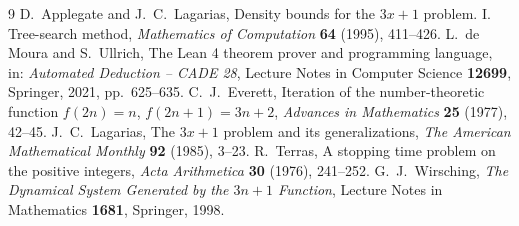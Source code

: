 \documentclass[11pt,reqno,oneside]{amsart}
\theoremstyle{plain}
\theoremstyle{definition}
\numberwithin{equation}{section}
\begin{document}
\begin{thebibliography}{9}
D.~Applegate and J.~C.~Lagarias, Density bounds for the $3x+1$ problem. I. Tree-search method, \emph{Mathematics of Computation} \textbf{64} (1995), 411--426.
L.~de Moura and S.~Ullrich, The Lean 4 theorem prover and programming language, in: \emph{Automated Deduction -- CADE 28}, Lecture Notes in Computer Science \textbf{12699}, Springer, 2021, pp.~625--635.
C.~J.~Everett, Iteration of the number-theoretic function $f(2n)=n$, $f(2n+1)=3n+2$, \emph{Advances in Mathematics} \textbf{25} (1977), 42--45.
J.~C.~Lagarias, The $3x+1$ problem and its generalizations, \emph{The American Mathematical Monthly} \textbf{92} (1985), 3--23.
R.~Terras, A stopping time problem on the positive integers, \emph{Acta Arithmetica} \textbf{30} (1976), 241--252.
G.~J.~Wirsching, \emph{The Dynamical System Generated by the $3n+1$ Function}, Lecture Notes in Mathematics \textbf{1681}, Springer, 1998.
\end{thebibliography}
\end{document}
